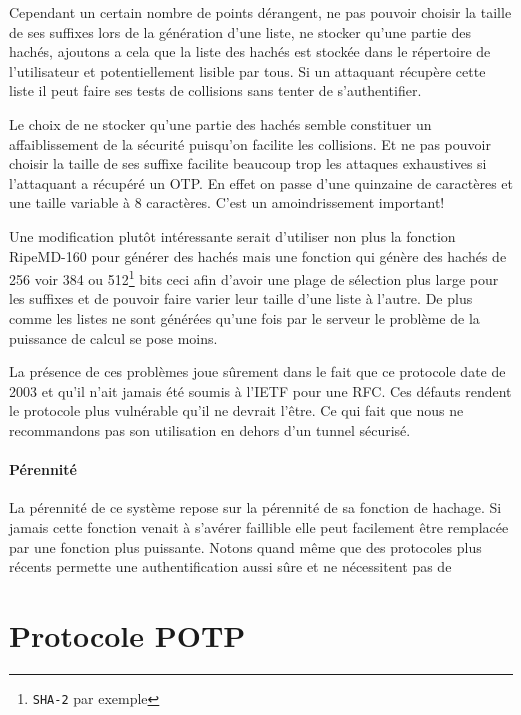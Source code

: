 \documentclass{../res/univ-projet}
\begin{document}
        Cependant un certain nombre de points dérangent, ne pas pouvoir choisir
    la taille de ses suffixes lors de la génération d'une liste, ne stocker qu'une partie des hachés, ajoutons a 
    cela que la liste des hachés est stockée dans le répertoire de l'utilisateur et potentiellement lisible par tous.
    Si un attaquant récupère cette liste il peut faire ses tests de collisions sans tenter de s'authentifier.

        Le choix de ne stocker qu'une partie des hachés semble constituer un affaiblissement de la sécurité puisqu'on facilite
    les collisions. Et ne pas pouvoir choisir la taille de ses suffixe facilite beaucoup trop les attaques exhaustives
    si l'attaquant a récupéré un OTP. En effet on passe d'une quinzaine de caractères et une taille variable à 8 caractères.
    C'est un amoindrissement important!

        Une modification plutôt intéressante serait d'utiliser non plus la fonction RipeMD-160 pour générer des hachés mais
    une fonction qui génère des hachés de 256 voir 384 ou 512\footnote{\verb?SHA-2? par exemple} bits ceci afin d'avoir une
    plage de sélection plus large pour les suffixes et de pouvoir faire varier leur taille d'une liste à l'autre.
    De plus comme les listes ne sont générées qu'une fois par le serveur le problème de la puissance de calcul se pose moins.

        La présence de ces \og problèmes \fg{} joue sûrement dans le fait que ce protocole date de 2003 et qu'il n'ait jamais
    été soumis à l'IETF pour une RFC. Ces défauts rendent le protocole plus vulnérable qu'il ne devrait l'être. Ce qui fait
    que nous ne recommandons pas son utilisation en dehors d'un tunnel sécurisé.

\subsection{Pérennité}
    La pérennité de ce système repose sur la pérennité de sa fonction de hachage. Si jamais cette
    fonction venait à s'avérer faillible elle peut facilement être remplacée par une fonction plus
    puissante.
        Notons quand même que des protocoles plus récents permette une authentification aussi sûre
    et ne nécessitent pas de 

\setcounter{section}{0}
\part{Protocole POTP}
\end{document}
